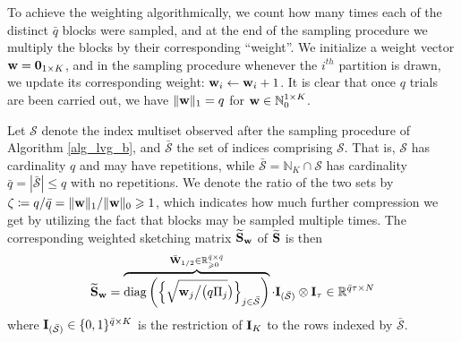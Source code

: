 \documentclass[journal,letterpaper,onecolumn,twoside,nofonttune]{IEEEtran}
\newcommand{\N}{\mathbb{N}}
\newcommand{\R}{\mathbb{R}}
\newcommand{\Scal}{\mathcal{S}}
\newcommand{\Sbar}{\bar{\mathcal{S}}}
\newcommand{\qbar}{\bar{q}}
\newcommand{\Ib}{\bold{I}}
\newcommand{\Sb}{\bold{S}}
\newcommand{\Sbwt}{\widetilde{\Sb}}
\newcommand{\Sbw}{\Sbwt_{\wb}}
\newcommand{\wb}{\bold{w}}
\newcommand{\Wbb}{\bar{\bold{W}}}
\newcommand{\diag}{\mathrm{diag}}
\begin{document}
To achieve the weighting algorithmically, we count how many times each of the distinct $\qbar$ blocks were sampled, and at the end of the sampling procedure we multiply the blocks by their corresponding ``weight''. We initialize a weight vector $\wb=\bold{0}_{1\times K}$, and in the sampling procedure whenever the $i^{th}$ partition is drawn, we update its corresponding weight: $\wb_i\gets\wb_i+1$. It is clear that once $q$ trials are been carried out, we have $\|\wb\|_1=q$ for $\wb\in\N_0^{1\times K}$.

Let $\Scal$ denote the index multiset observed after the sampling procedure of Algorithm \ref{alg_lvg_b}, and $\Sbar$ the set of indices comprising $\Scal$. That is, $\Scal$ has cardinality $q$ and may have repetitions, while $\Sbar=\N_K\cap\Scal$ has cardinality $\qbar=|\Sbar|\leqslant q$ with no repetitions. We denote the ratio of the two sets by $\zeta\coloneqq q/\qbar=\|\wb\|_1/\|\wb\|_0\geqslant1$, which indicates how much further compression we get by utilizing the fact that blocks may be sampled multiple times. The corresponding weighted sketching matrix $\Sbw$ of $\Sbwt$ is then
\begin{equation}
\label{expr_Sw}
  \Sbw = \overbrace{\diag\left(\Big\{\sqrt{\wb_j\big/\big(q\Pi_j}\big)\Big\}_{j\in\Sbar}\right)}^{\Wbb_{1/2}\in\R_{\geqslant0}^{\qbar\times\qbar}}\cdot\Ib_{(\Sbar)}\otimes\Ib_\tau \in \R^{\qbar\tau\times N}
\end{equation}
where $\Ib_{(\Sbar)}\in\{0,1\}^{\qbar\times K}$ is the restriction of $\Ib_{K}$ to the rows indexed by $\Sbar$.
\end{document}
